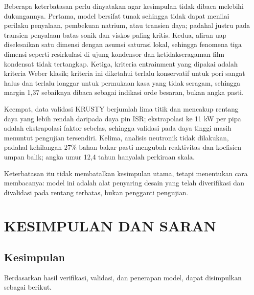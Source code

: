 \documentclass[
  indonesian,
  12pt,
  a4paper,
]{report}
\begin{document}
Beberapa keterbatasan perlu dinyatakan agar kesimpulan tidak dibaca
melebihi dukungannya. Pertama, model bersifat tunak sehingga tidak dapat
menilai perilaku penyalaan, pembekuan natrium, atau transien daya;
padahal justru pada transien penyalaan batas sonik dan viskos paling
kritis. Kedua, aliran uap diselesaikan satu dimensi dengan asumsi
saturasi lokal, sehingga fenomena tiga dimensi seperti resirkulasi di
ujung kondensor dan ketidakseragaman film kondensat tidak tertangkap.
Ketiga, kriteria entrainment yang dipakai adalah kriteria Weber klasik;
kriteria ini diketahui terlalu konservatif untuk pori sangat halus dan
terlalu longgar untuk permukaan kasa yang tidak seragam, sehingga margin
1,37 sebaiknya dibaca sebagai indikasi orde besaran, bukan angka pasti.

Keempat, data validasi KRUSTY berjumlah lima titik dan mencakup rentang
daya yang lebih rendah daripada daya pin ISR; ekstrapolasi ke 11 kW per
pipa adalah ekstrapolasi faktor sebelas, sehingga validasi pada daya
tinggi masih menuntut pengujian tersendiri. Kelima, analisis neutronik
tidak dilakukan, padahal kehilangan 27\% bahan bakar pasti mengubah
reaktivitas dan koefisien umpan balik; angka umur 12,4 tahun hanyalah
perkiraan skala.

Keterbatasan itu tidak membatalkan kesimpulan utama, tetapi menentukan
cara membacanya: model ini adalah alat penyaring desain yang telah
diverifikasi dan divalidasi pada rentang terbatas, bukan pengganti
pengujian.

\chapter{KESIMPULAN DAN SARAN}\label{kesimpulan-dan-saran}

\section{Kesimpulan}\label{kesimpulan}

Berdasarkan hasil verifikasi, validasi, dan penerapan model, dapat
disimpulkan sebagai berikut.
\end{document}
